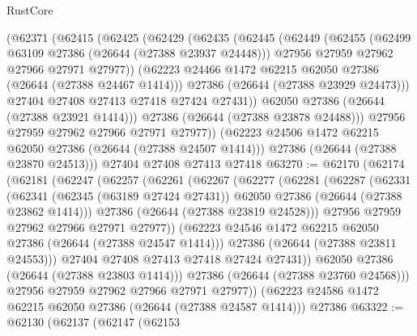 \begin{lexlean}{RustCore}
\begin{coremodule}
        (@62371
          (@62415
            (@62425
              (@62429
                (@62435
                  (@62445
                    (@62449
                      (@62455
                        (@62499 @63109 @27386 (@26644 (@27388 @23937 @24448)))
                        @27956
                        @27959
                        @27962
                        @27966
                        @27971
                        @27977))
                    (@62223 @24466 @1472 @62215 @62050 @27386 (@26644 (@27388 @24467 @1414)))
                    @27386
                    (@26644 (@27388 @23929 @24473)))
                  @27404
                  @27408
                  @27413
                  @27418
                  @27424
                  @27431))
              @62050
              @27386
              (@26644 (@27388 @23921 @1414)))
            @27386
            (@26644 (@27388 @23878 @24488)))
          @27956
          @27959
          @27962
          @27966
          @27971
          @27977))
      (@62223 @24506 @1472 @62215 @62050 @27386 (@26644 (@27388 @24507 @1414)))
      @27386
      (@26644 (@27388 @23870 @24513)))
    @27404
    @27408
    @27413
    @27418
@63270 := @62170
    (@62174
      (@62181
        (@62247
          (@62257
            (@62261
              (@62267
                (@62277
                  (@62281
                    (@62287
                      (@62331
                        (@62341
                          (@62345 (@63189 @27424 @27431))
                          @62050
                          @27386
                          (@26644 (@27388 @23862 @1414)))
                        @27386
                        (@26644 (@27388 @23819 @24528)))
                      @27956
                      @27959
                      @27962
                      @27966
                      @27971
                      @27977))
                  (@62223 @24546 @1472 @62215 @62050 @27386 (@26644 (@27388 @24547 @1414)))
                  @27386
                  (@26644 (@27388 @23811 @24553)))
                @27404
                @27408
                @27413
                @27418
                @27424
                @27431))
            @62050
            @27386
            (@26644 (@27388 @23803 @1414)))
          @27386
          (@26644 (@27388 @23760 @24568)))
        @27956
        @27959
        @27962
        @27966
        @27971
        @27977))
    (@62223 @24586 @1472 @62215 @62050 @27386 (@26644 (@27388 @24587 @1414)))
    @27386
@63322 := @62130
    (@62137
      (@62147
        (@62153

\end{coremodule}
\end{lexlean}
